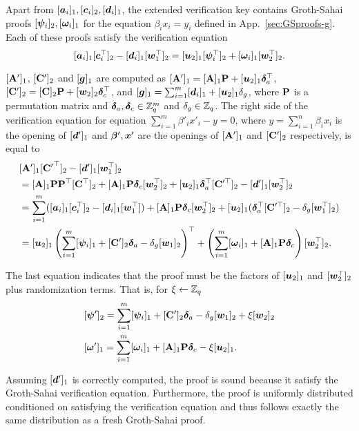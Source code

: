 Apart from $[{\boldsymbol{a}}_i]_1,[{\boldsymbol{c}}_i]_2,[{\boldsymbol{d}}_i]_1$, the extended verification key contains Groth-Sahai proofs $[{\boldsymbol{\psi}}_i]_2,[{\boldsymbol{\omega}}_i]_1$ for the equation $\beta_ix_i = y_i$ defined in App.~\ref{sec:GSproofs-g}. Each of these proofs satisfy the verification equation
$$
[{\boldsymbol{a}}_i]_1[{\boldsymbol{c}}_i^\top]_2 - [{\boldsymbol{d}}_i]_1[{\boldsymbol{w}}_1^\top]_2 = [{\boldsymbol{u}}_2]_1[{\boldsymbol{\psi}}^\top_i]_2 + [{\boldsymbol{\omega}}_i]_1[{\boldsymbol{w}}_2^\top]_2.
$$

$[\mathbf{{A}}']_1$, $[\mathbf{{C}}']_2$ and $[{\boldsymbol{g}}]_1$ are computed as $[\mathbf{{A}}']_1 = [\mathbf{{A}}]_1\mathbf{{P}}+[{\boldsymbol{u}}_2]_1{\boldsymbol{\delta}}_a^\top$, $[\mathbf{{C}}']_2 = [\mathbf{{C}}]_2\mathbf{{P}}+[{\boldsymbol{w}}_2]_2{\boldsymbol{\delta}}_c^\top$, and $[{\boldsymbol{g}}]_1 = \sum_{i=1}^m [{\boldsymbol{d}}_i]_1 + [{\boldsymbol{u}}_2]_1\delta_g$, where $\mathbf{{P}}$ is a permutation matrix and ${\boldsymbol{\delta}}_a,{\boldsymbol{\delta}}_c\in\mathbb{Z}_q^m$ and $\delta_g\in\mathbb{Z}_q$.
The right side of the verification equation for equation $\sum_{i=1}^m\beta'_i x'_i - y = 0$, where $y=\sum_{i=1}^n \beta_ix_i$ is the opening of $[{\boldsymbol{d}}']_1$ and ${\boldsymbol{\beta}}',{\boldsymbol{x}}'$ are the openings of $[\mathbf{{A}}']_1$ and $[\mathbf{{C}}']_2$ respectively, is equal to
\begin{align*}
&[\mathbf{{A}}']_1[{\mathbf{{C}}'}^\top]_2 - [{\boldsymbol{d}}']_1[{\boldsymbol{w}}_1^\top]_2\\
&= [\mathbf{{A}}]_1\mathbf{{P}}\mathbf{{P}}^\top[\mathbf{{C}}^\top]_2 + [\mathbf{{A}}]_1\mathbf{{P}}{\boldsymbol{\delta}}_c[{\boldsymbol{w}}_2^\top]_2 + [{\boldsymbol{u}}_2]_1{\boldsymbol{\delta}}_a^\top[\mathbf{{C}}'^\top]_2-[{\boldsymbol{d}}']_1[{\boldsymbol{w}}_2^\top]_2\\
&=\sum_{i=1}^m ([{\boldsymbol{a}}_i]_1[{\boldsymbol{c}}_i^\top]_2-[{\boldsymbol{d}}_i]_1[{\boldsymbol{w}}_1^\top]) +[\mathbf{{A}}]_1\mathbf{{P}}{\boldsymbol{\delta}}_c[{\boldsymbol{w}}_2^\top]_2 + [{\boldsymbol{u}}_2]_1({\boldsymbol{\delta}}_a^\top[\mathbf{{C}}'^\top]_2-\delta_g[{\boldsymbol{w}}_1^\top]_2)\\
&= [{\boldsymbol{u}}_2]_1\left(\sum_{i=1}^m[{\boldsymbol{\psi}}_i]_1+[\mathbf{{C}}']_2{\boldsymbol{\delta}}_a-\delta_g[{\boldsymbol{w}}_1]_2\right)^\top + \left(\sum_{i=1}^m[{\boldsymbol{\omega}}_i]_1+[\mathbf{{A}}]_1\mathbf{{P}}{\boldsymbol{\delta}}_c\right)[{\boldsymbol{w}}_2^\top]_2.
\end{align*}

The last equation indicates that the proof must be the factors of $[{\boldsymbol{u}}_2]_1$ and $[{\boldsymbol{w}}_2^\top]_2$ plus randomization terms. That is, for $\xi\gets\mathbb{Z}_q$
\begin{align}
&[{\boldsymbol{\psi}}']_2 = \sum_{i=1}^m[{\boldsymbol{\psi}}_i]_1+[\mathbf{{C}}']_2{\boldsymbol{\delta}}_a-\delta_g[{\boldsymbol{w}}_1]_2 + \xi[{\boldsymbol{w}}_2]_2\nonumber\\
&
[{\boldsymbol{\omega}}']_1 = \sum_{i=1}^m[{\boldsymbol{\omega}}_i]_1+[\mathbf{{A}}]_1\mathbf{{P}}{\boldsymbol{\delta}}_c - \xi[{\boldsymbol{u}}_2]_1.\label{eq:rerand-proofs-g}
\end{align}

Assuming $[{\boldsymbol{d}}']_1$ is correctly computed, the proof is sound because it satisfy the Groth-Sahai verification equation. Furthermore, the proof is uniformly distributed conditioned on satisfying the verification equation and thus follows exactly the same distribution as a fresh Groth-Sahai proof.
